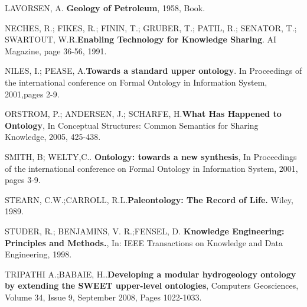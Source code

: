 \documentclass[ti]{iiufrgs}
\begin{document}
\begin{thebibliography}{este-parametro-nao-eh-usado-pelo-estilo-ABNT}
 LAVORSEN, A.\@ \textbf{ Geology of Petroleum}, 1958, Book.

NECHES, R.; FIKES, R.; FININ, T.; GRUBER, T.; PATIL, R.; SENATOR, T.; SWARTOUT, W.R.\@ \textbf{Enabling Technology for Knowledge Sharing}. AI Magazine, page 36-56, 	1991.

NILES, I.; PEASE, A.\@ \textbf{Towards a standard upper ontology}. In Proceedings of the 	international conference on Formal Ontology in 	Information System, 2001,pages 2-9.

ORSTROM, P.; ANDERSEN, J.; SCHARFE, H.\@ \textbf{What Has Happened to Ontology}, In Conceptual Structures: Common Semantics for Sharing Knowledge, 2005, 425-438.


 SMITH, B; WELTY,C.\@. \textbf{Ontology: towards a new synthesis}, In Proceedings of the international conference on Formal Ontology in Information System, 2001, pages 3-9.

STEARN, C.W.;CARROLL, R.L.\@\textbf{Paleontology: The Record of Life.} Wiley, 1989.

STUDER, R.; BENJAMINS, V. R.;FENSEL, D.\@ \textbf{ Knowledge Engineering: Principles and Methods.}, In: IEEE Transactions on Knowledge and Data Engineering, 1998. 

TRIPATHI A.;BABAIE, H.\@.\textbf{Developing a modular hydrogeology ontology by extending the SWEET upper-level ontologies}, Computers Geosciences, Volume 34, Issue 9, September 2008, Pages 1022-1033.



\end{thebibliography}
\end{document}
